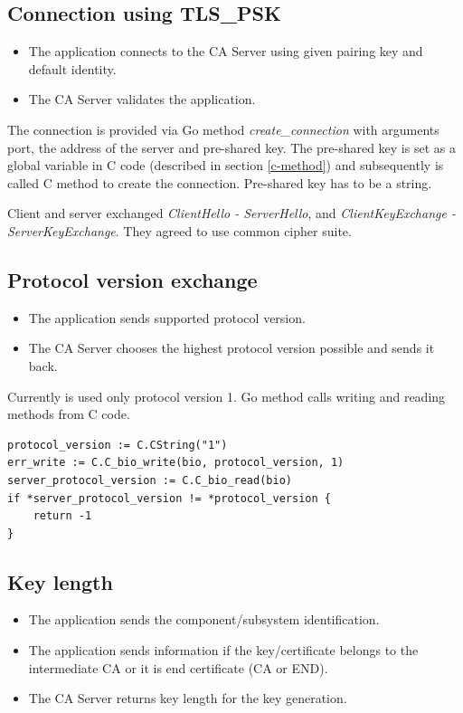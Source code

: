 \documentclass[
  digital, %
  notable,   %
  lof,     %
  lot,     %
]{fithesis3}
\begin{document}
\subsection{Connection using TLS\_PSK}
\begin{itemize}[leftmargin=2em,rightmargin=1em,itemsep=0.75\parskip,parsep=0em,topsep=0em,partopsep=0em]
\item The application connects to the CA Server using given pairing key and default identity.
\item The CA Server validates the application.
\end{itemize}

The connection is provided via Go method \textit{create\_connection} with arguments port, the 
address of the server and pre-shared key. The pre-shared key is set as a global variable in C code 
(described in section \ref{c-method}) and subsequently is called C method to create the connection. 
Pre-shared key has to be a string.

Client and server exchanged \textit{ClientHello - ServerHello}, and \textit{ClientKeyExchange - 
ServerKeyExchange}. They agreed to use common cipher suite. 

\subsection{Protocol version exchange}
\begin{itemize}[leftmargin=2em,rightmargin=1em,itemsep=0.75\parskip,parsep=0em,topsep=0em,partopsep=0em]
\item The application sends supported protocol version.
\item The CA Server chooses the highest protocol version possible and sends it back.
\end{itemize}

Currently is used only protocol version 1. Go method calls writing and reading methods from C 
code.

\begin{lstlisting}
protocol_version := C.CString("1")
err_write := C.C_bio_write(bio, protocol_version, 1)
server_protocol_version := C.C_bio_read(bio)
if *server_protocol_version != *protocol_version {
	return -1
} 
\end{lstlisting}


\subsection{Key length}
\begin{itemize}[leftmargin=2em,rightmargin=1em,itemsep=0.75\parskip,parsep=0em,topsep=0em,partopsep=0em]
\item The application sends the component/subsystem identification.
\item The application sends information if the key/certificate belongs to the intermediate CA or it is end certificate (CA or END).
\item The CA Server returns key length for the key generation.
\end{itemize}
    
\end{document}

